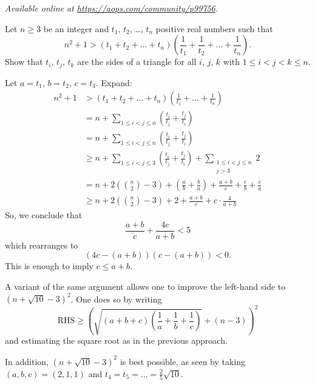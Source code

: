 \textsl{Available online at \url{https://aops.com/community/p99756}.}
\begin{mdframed}[style=mdpurplebox,frametitle={Problem statement}]
Let $n \ge 3$ be an integer
and $t_1$, $t_2$, \dots, $t_n$ positive real numbers such that
\[ n^2+1 > \left(t_1 + t_2 + \dots + t_n\right)
  \left( \frac{1}{t_1} + \frac{1}{t_2} + \dots + \frac{1}{t_n} \right). \]
Show that $t_i$, $t_j$, $t_k$ are the sides of a triangle
for all $i$, $j$, $k$ with $1 \le i < j < k \le n$.
\end{mdframed}
Let $a = t_1$, $b = t_2$, $c = t_3$.
Expand:
\begin{align*}
  n^2+1 &> \left(t_1 + t_2 + \dots + t_n\right)
    \left( \frac{1}{t_1} + \dots + \frac{1}{t_n} \right) \\
  &= n + \sum_{1 \le i < j \le n}
    \left( \frac{t_i}{t_j} + \frac{t_j}{t_i} \right) \\
  &= n + \sum_{1 \le i < j \le n}
    \left( \frac{t_i}{t_j} + \frac{t_j}{t_i} \right) \\
  &\ge n + \sum_{1 \le i < j \le 3}
    \left( \frac{t_i}{t_j} + \frac{t_j}{t_i} \right)
    + \sum_{\substack{1 \le i < j \le n \\ j > 3 }} 2 \\
  &= n + 2\left( \binom n2-3 \right)
    + \left( \frac ab + \frac ba \right)
    + \frac{a+b}{c} + \frac{c}{b} + \frac{c}{a} \\
  &\ge n + 2\left( \binom n2-3 \right) + 2
    + \frac{a+b}{c} + c \cdot \frac{4}{a+b}
\end{align*}
So, we conclude that
\[ \frac{a+b}{c} + \frac{4c}{a+b} < 5 \]
which rearranges to
\[ \left( 4c-(a+b) \right)\left( c-(a+b) \right) < 0. \]
This is enough to imply $c \le a+b$.

\begin{remark*}
  A variant of the same argument allows one to improve
  the left-hand side to $(n+\sqrt{10}-3)^2$.
  One does so by writing
  \[ \text{RHS} \ge \left( \sqrt{\left( a+b+c \right)
    \left( \frac1a+\frac1b+\frac1c \right)} + (n-3) \right)^2 \]
  and estimating the square root as in the previous approach.

  In addition, $(n+\sqrt{10}-3)^2$ is best possible,
  as seen by taking $(a,b,c) = (2,1,1)$ and $t_4 = t_5 = \dots = \frac25 \sqrt{10}$.
\end{remark*}
\pagebreak